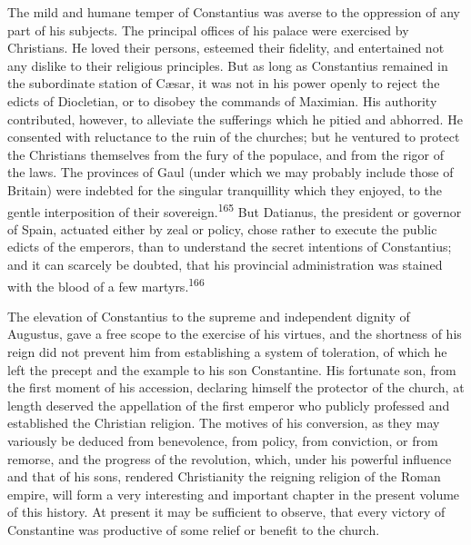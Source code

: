 The mild and humane temper of Constantius was averse to the
oppression of any part of his subjects. The principal offices of
his palace were exercised by Christians. He loved their persons,
esteemed their fidelity, and entertained not any dislike to their
religious principles. But as long as Constantius remained in the
subordinate station of Cæsar, it was not in his power openly to
reject the edicts of Diocletian, or to disobey the commands of
Maximian. His authority contributed, however, to alleviate the
sufferings which he pitied and abhorred. He consented with
reluctance to the ruin of the churches; but he ventured to
protect the Christians themselves from the fury of the populace,
and from the rigor of the laws. The provinces of Gaul (under
which we may probably include those of Britain) were indebted for
the singular tranquillity which they enjoyed, to the gentle
interposition of their sovereign.\textsuperscript{165} But Datianus, the president
or governor of Spain, actuated either by zeal or policy, chose
rather to execute the public edicts of the emperors, than to
understand the secret intentions of Constantius; and it can
scarcely be doubted, that his provincial administration was
stained with the blood of a few martyrs.\textsuperscript{166}

The elevation of Constantius to the supreme and independent
dignity of Augustus, gave a free scope to the exercise of his
virtues, and the shortness of his reign did not prevent him from
establishing a system of toleration, of which he left the precept
and the example to his son Constantine. His fortunate son, from
the first moment of his accession, declaring himself the
protector of the church, at length deserved the appellation of
the first emperor who publicly professed and established the
Christian religion. The motives of his conversion, as they may
variously be deduced from benevolence, from policy, from
conviction, or from remorse, and the progress of the revolution,
which, under his powerful influence and that of his sons,
rendered Christianity the reigning religion of the Roman empire,
will form a very interesting and important chapter in the present
volume of this history. At present it may be sufficient to
observe, that every victory of Constantine was productive of some
relief or benefit to the church.


